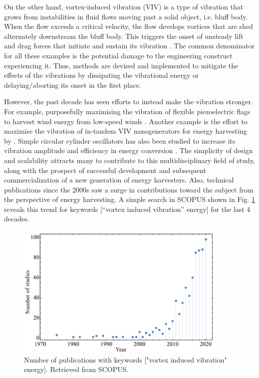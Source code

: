 \documentclass[oneside]{utmthesis}
\begin{document}
On the other hand, vortex-induced vibration (VIV) is a type of vibration that grows from instabilities in fluid flows moving past a solid object, i.e. bluff body. When the flow exceeds a critical velocity, the flow develops vortices that are shed alternately downstream the bluff body. This triggers the onset of unsteady lift and drag forces that initiate and sustain its vibration \citep{Bukka2020}. The common denominator for all these examples is the potential damage to the engineering construct experiencing it. Thus, methods are devised and implemented to mitigate the effects of the vibrations by dissipating the vibrational energy or delaying/aborting its onset in the first place.

However, the past decade has seen efforts to instead make the vibration stronger. For example, purposefully maximising the vibration of flexible piezoelectric flags to harvest wind energy from low-speed winds \citep{Mehdipour2022}. Another example is the effort to maximise the vibration of in-tandem VIV nanogenerators for energy harvesting by \citep{Zhang2022a}. Simple circular cylinder oscillators has also been studied to increase its vibration amplitude and efficiency in energy conversion \citep{Zhang2022b}.
The simplicity of design and scalability attracts many to contribute to this multidisciplinary field of study, along with the prospect of successful development and subsequent commercialization of a new generation of energy harvesters.
Also, technical publications since the 2000s saw a surge in contributions toward the subject from the perspective of energy harvesting. A simple search in SCOPUS shown in Fig. \ref{fig:scopusTrend} reveals this trend for keywords [“vortex induced vibration” energy] for the last 4 decades.

\begin{figure}[H]
  \centering
  \includegraphics[width=0.9\textwidth]{figs/scopusTrend}
  \caption{Number of publications with keywords ["vortex induced vibration" energy]. Retrieved from SCOPUS.}
  \label{fig:scopusTrend}
\end{figure}
\end{document}
